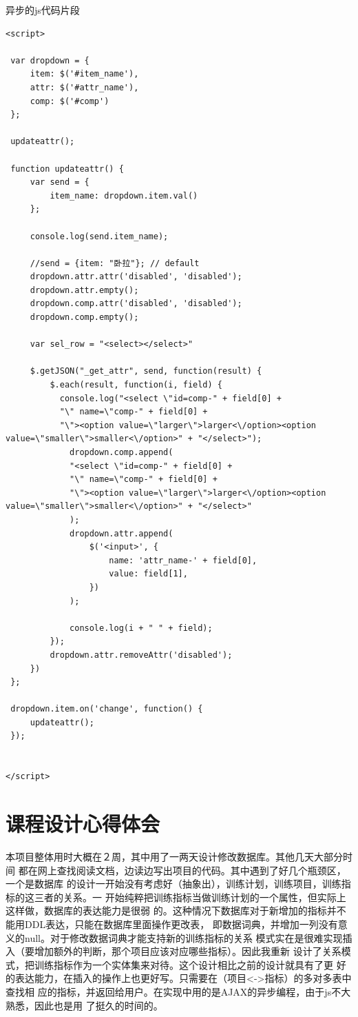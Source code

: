 异步的js代码片段
\begin{Verbatim}[]
<script>

 var dropdown = {
     item: $('#item_name'),
     attr: $('#attr_name'),
     comp: $('#comp')
 };

 updateattr();

 function updateattr() {
     var send = {
         item_name: dropdown.item.val()
     };

     console.log(send.item_name);

     //send = {item: "卧拉"}; // default
     dropdown.attr.attr('disabled', 'disabled');
     dropdown.attr.empty();
     dropdown.comp.attr('disabled', 'disabled');
     dropdown.comp.empty();

     var sel_row = "<select></select>"

     $.getJSON("_get_attr", send, function(result) {
         $.each(result, function(i, field) {
           console.log("<select \"id=comp-" + field[0] +
           "\" name=\"comp-" + field[0] +
           "\"><option value=\"larger\">larger<\/option><option value=\"smaller\">smaller<\/option>" + "</select>");
             dropdown.comp.append(
             "<select \"id=comp-" + field[0] +
             "\" name=\"comp-" + field[0] +
             "\"><option value=\"larger\">larger<\/option><option value=\"smaller\">smaller<\/option>" + "</select>"
             );
             dropdown.attr.append(
                 $('<input>', {
                     name: 'attr_name-' + field[0],
                     value: field[1],
                 })
             );

             console.log(i + " " + field);
         });
         dropdown.attr.removeAttr('disabled');
     })
 };

 dropdown.item.on('change', function() {
     updateattr();
 });


</script>

\end{Verbatim}

\section{课程设计心得体会}
本项目整体用时大概在２周，其中用了一两天设计修改数据库。其他几天大部分时间
都在网上查找阅读文档，边读边写出项目的代码。其中遇到了好几个瓶颈区，一个是数据库
的设计一开始没有考虑好（抽象出），训练计划，训练项目，训练指标的这三者的关系。一
开始纯粹把训练指标当做训练计划的一个属性，但实际上这样做，数据库的表达能力是很弱
的。这种情况下数据库对于新增加的指标并不能用DDL表达，只能在数据库里面操作更改表，
即数据词典，并增加一列没有意义的null。对于修改数据词典才能支持新的训练指标的关系
模式实在是很难实现插入（要增加额外的判断，那个项目应该对应哪些指标）。因此我重新
设计了关系模式，把训练指标作为一个实体集来对待。这个设计相比之前的设计就具有了更
好的表达能力，在插入的操作上也更好写。只需要在（项目<->指标）的多对多表中查找相
应的指标，并返回给用户。在实现中用的是AJAX的异步编程，由于js不大熟悉，因此也是用
了挺久的时间的。

